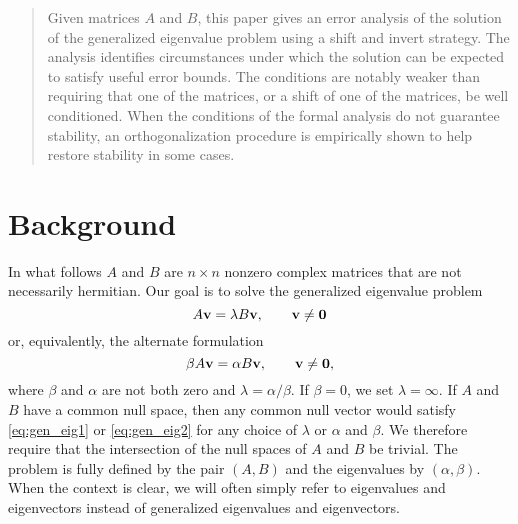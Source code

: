 \documentclass[12pt]{article}
\def\vec#1{{\bf #1}}
\begin{document}
\maketitle
\begin{abstract}
  Given matrices $A$ and $B$, this paper gives an error analysis of
  the solution of the generalized eigenvalue problem using a shift and
  invert strategy.  The analysis identifies circumstances under which
  the solution can be expected to satisfy useful error bounds.  The
  conditions are notably weaker than requiring that one of the
  matrices, or a shift of one of the matrices, be well conditioned.
  When the conditions of the formal analysis do not guarantee
  stability, an orthogonalization procedure is empirically shown to
  help restore stability in some cases.
\end{abstract}
\pagestyle{myheadings}
\thispagestyle{plain}

\section{Background}
\label{sec:background}

In what follows $A$ and $B$ are $n\times n$ nonzero complex matrices
that are not necessarily hermitian.  Our goal is to solve the
generalized eigenvalue problem
\begin{equation}
  \label{eq:gen_eig1}
  A\vec{v} = \lambda B \vec{v}, \qquad \vec{v} \neq \vec{0}
\end{equation}
or, equivalently, the alternate formulation
\begin{equation}
  \label{eq:gen_eig2}
  \beta A \vec{v} = \alpha B \vec{v}, \qquad \vec{v}\neq \vec{0},
\end{equation}
where $\beta$ and $\alpha$ are not both zero and
$\lambda = \alpha/\beta$.  If $\beta = 0$, we set $\lambda = \infty$.
If $A$ and $B$ have a common null space, then any common null vector
would satisfy \eqref{eq:gen_eig1} or \eqref{eq:gen_eig2} for any
choice of $\lambda$ or $\alpha$ and $\beta$.  We therefore require
that the intersection of the null spaces of $A$ and $B$ be trivial.
The problem is fully defined by the pair $(A,B)$ and the eigenvalues
by $(\alpha, \beta)$.  When the context is clear, we will often simply
refer to eigenvalues and eigenvectors instead of generalized
eigenvalues and eigenvectors.
\end{document}
